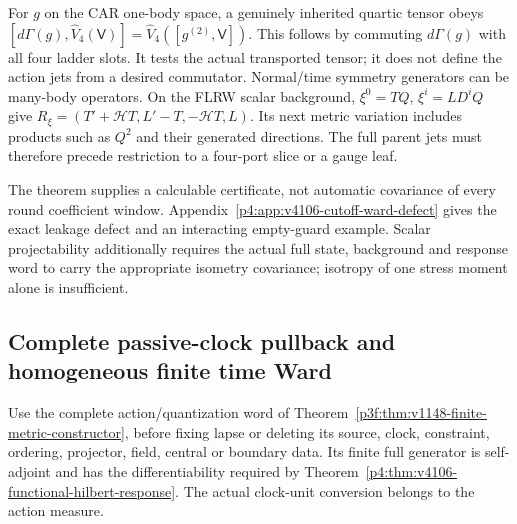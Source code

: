 \documentclass[12pt,a4paper]{article}
\begin{document}
For $g$ on the CAR one-body space, a genuinely inherited quartic tensor
obeys
$[d\Gamma(g),\widehat V_4(\mathsf V)]
 =\widehat V_4([g^{(2)},\mathsf V])$.
This follows by commuting $d\Gamma(g)$ with all four ladder slots.
It tests the actual transported tensor; it does not define the action
jets from a desired commutator. Normal/time symmetry generators can be
many-body operators. On the FLRW scalar background,
$\xi^0=TQ$, $\xi^i=LD^iQ$ give
$R_\xi=(T'+\mathcal HT,L'-T,-\mathcal HT,L)$.
Its next metric variation includes products such as $Q^2$ and their
generated directions. The full parent jets must therefore precede
restriction to a four-port slice or a gauge leaf.

The theorem supplies a calculable certificate, not automatic covariance of
every round coefficient window. Appendix~\ref{p4:app:v4106-cutoff-ward-defect}
gives the exact leakage defect and an interacting empty-guard example.
Scalar projectability additionally requires the actual full state,
background and response word to carry the appropriate isometry covariance;
isotropy of one stress moment alone is insufficient.






\subsection{Complete passive-clock pullback and homogeneous finite time Ward}
\label{p4:sec:v4118-passive-time}

Use the complete action/quantization word of
Theorem~\ref{p3f:thm:v1148-finite-metric-constructor}, before fixing lapse
or deleting its source, clock, constraint, ordering, projector, field,
central or boundary data. Its finite full generator is self-adjoint and
has the differentiability required by
Theorem~\ref{p4:thm:v4106-functional-hilbert-response}.
The actual clock-unit conversion belongs to the action measure.
\end{document}
